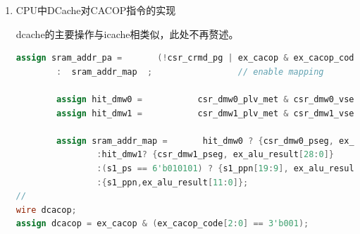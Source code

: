 \documentclass[11pt]{article}
\begin{document}
\begin{enumerate}
\begin{lstlisting}[language=verilog]
    \end{lstlisting}

    其中的icacop_complete信号，用来标记ICache的cacop指令是否执行完毕.
    \begin{lstlisting}[language=verilog]
    always @(posedge clk) begin
    if (~resetn) begin
        icacop_complete <= 1'b1;
    end
    else if (icacop & cacop_code[4:3] != 2'b10) begin
        icacop_complete <= 1'b1;
    end
    else if (icacop_next & cacop_code[4:3] == 2'b10) begin
        icacop_complete <= 1'b1;
    end
    else  
        icacop_complete <= 1'b0;
    end
    \end{lstlisting}

    当op为10时，需要将cacop指令的虚拟地址s0_vppn, s0_va_bit12传入tlb，代码如下：
    \begin{lstlisting}[language=verilog]
        assign icacop_vaddr = pre_pc & {32{~icacop| cacop_code[4:3]!=2'b10|icacop_complete}}
        | icacop_addr&{32{icacop & ~icacop_complete &cacop_code[4:3]==2'b10}};
        assign {s0_vppn, s0_va_bit12} = icacop_vaddr[31:12];// output to tlb
    \end{lstlisting}
    \item CPU中DCache对CACOP指令的实现
    
    dcache的主要操作与icache相类似，此处不再赘述。

    \begin{lstlisting}[language=verilog]
        assign sram_addr_pa =       (!csr_crmd_pg | ex_cacop & ex_cacop_code == 5'b00001 | ex_cacop & ex_cacop_code == 5'b01001) ? ex_alu_result    // direct translate
        :  sram_addr_map  ;                 // enable mapping
    
        assign hit_dmw0 =           csr_dmw0_plv_met & csr_dmw0_vseg == ex_alu_result[31:29] & ~(dcacop & ex_cacop_code[4:3] != 2'b10);
        assign hit_dmw1 =           csr_dmw1_plv_met & csr_dmw1_vseg == ex_alu_result[31:29] & !hit_dmw0 & ~(dcacop & ex_cacop_code[4:3] != 2'b10);

        assign sram_addr_map =       hit_dmw0 ? {csr_dmw0_pseg, ex_alu_result[28:0]}         // dierct map windows 0
                :hit_dmw1? {csr_dmw1_pseg, ex_alu_result[28:0]}         // direct map windows 1
                :(s1_ps == 6'b010101) ? {s1_ppn[19:9], ex_alu_result[20:0]}   // tlb map: ps 4Mb
                :{s1_ppn,ex_alu_result[11:0]};                             // tlb map : ps 4kb
//
wire dcacop;
assign dcacop = ex_cacop & (ex_cacop_code[2:0] == 3'b001);
    \end{lstlisting}
\end{enumerate}
\end{document}
